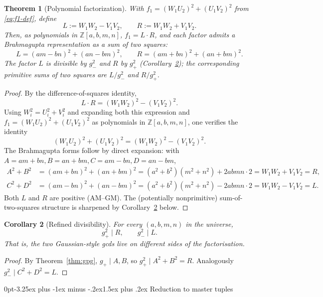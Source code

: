\documentclass[12pt,a4paper,reqno]{amsart}
\makeatletter
\renewcommand{\subsection}{\@startsection{subsection}{2}%
  {0pt}{-3.25ex plus -1ex minus -.2ex}{1.5ex plus .2ex}%
  {\normalfont\normalsize\bfseries}}
\theoremstyle{plain}
\newtheorem{theorem}{Theorem}[section]
\newtheorem{corollary}[theorem]{Corollary}
\theoremstyle{definition}
\theoremstyle{remark}
\newcommand{\Z}{\mathbb{Z}}
\makeatother
\begin{document}
\begin{theorem}[Polynomial factorization]
\label{thm:LR}
With $f_1 = (W_1 U_2)^2 + (U_1 V_2)^2$ from \eqref{eq:f1-def}, define
$$
L := W_1 W_2 - V_1 V_2, \qquad R := W_1 W_2 + V_1 V_2.
$$
Then, as polynomials in $\Z[a, b, m, n]$, $f_1 = L \cdot R$, and each factor admits a Brahmagupta representation as a sum of two squares:
$$
L = (am - bn)^2 + (an - bm)^2, \qquad R = (am + bn)^2 + (an + bm)^2.
$$
The factor $L$ is divisible by $g_-^2$ and $R$ by $g_+^2$ (Corollary~\ref{cor:LR-divisibility}); the corresponding \emph{primitive} sums of two squares are $L / g_-^2$ and $R / g_+^2$.
\end{theorem}

\begin{proof}
By the difference-of-squares identity,
$$
L \cdot R = (W_1 W_2)^2 - (V_1 V_2)^2.
$$
Using $W_i^2 = U_i^2 + V_i^2$ and expanding both this expression and $f_1 = (W_1 U_2)^2 + (U_1 V_2)^2$ as polynomials in $\Z[a, b, m, n]$, one verifies the identity
$$
(W_1 U_2)^2 + (U_1 V_2)^2 = (W_1 W_2)^2 - (V_1 V_2)^2.
$$
The Brahmagupta forms follow by direct expansion: with $A = am+bn, B = an+bm, C = am-bn, D = an-bm$,
\begin{align*}
A^2 + B^2 &= (am+bn)^2 + (an+bm)^2 = (a^2+b^2)(m^2+n^2) + 2abmn \cdot 2 = W_1 W_2 + V_1 V_2 = R, \\
C^2 + D^2 &= (am-bn)^2 + (an-bm)^2 = (a^2+b^2)(m^2+n^2) - 2abmn \cdot 2 = W_1 W_2 - V_1 V_2 = L.
\end{align*}
Both $L$ and $R$ are positive (AM--GM). The (potentially nonprimitive) sum-of-two-squares structure is sharpened by Corollary~\ref{cor:LR-divisibility} below.
\end{proof}

\begin{corollary}[Refined divisibility]
\label{cor:LR-divisibility}
For every $(a, b, m, n)$ in the universe,
$$
g_+^2 \mid R, \qquad g_-^2 \mid L.
$$
That is, the two Gaussian-style gcds live on different sides of the factorisation.
\end{corollary}

\begin{proof}
By Theorem~\ref{thm:gpg}, $g_+ \mid A, B$, so $g_+^2 \mid A^2 + B^2 = R$. Analogously $g_-^2 \mid C^2 + D^2 = L$.
\end{proof}

\subsection{Reduction to master tuples}
\end{document}
